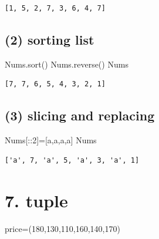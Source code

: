 \documentclass[
  a4paper,
  DIV=11,
  numbers=noendperiod]{scrreprt}
\newenvironment{Shaded}{\begin{snugshade}}{\end{snugshade}}
\newcommand{\DecValTok}[1]{\textcolor[rgb]{0.68,0.00,0.00}{#1}}
\newcommand{\NormalTok}[1]{\textcolor[rgb]{0.00,0.23,0.31}{#1}}
\newcommand{\OperatorTok}[1]{\textcolor[rgb]{0.37,0.37,0.37}{#1}}
\newcommand{\StringTok}[1]{\textcolor[rgb]{0.13,0.47,0.30}{#1}}
\begin{document}
\begin{verbatim}
[1, 5, 2, 7, 3, 6, 4, 7]
\end{verbatim}

\subsection*{(2) sorting list}\label{sorting-list}

\begin{Shaded}
\begin{Highlighting}[]
\NormalTok{Nums.sort()}
\NormalTok{Nums.reverse()}
\NormalTok{Nums}
\end{Highlighting}
\end{Shaded}

\begin{verbatim}
[7, 7, 6, 5, 4, 3, 2, 1]
\end{verbatim}

\subsection*{(3) slicing and replacing}\label{slicing-and-replacing}

\begin{Shaded}
\begin{Highlighting}[]
\NormalTok{Nums[::}\DecValTok{2}\NormalTok{]}\OperatorTok{=}\NormalTok{[}\StringTok{\textquotesingle{}a\textquotesingle{}}\NormalTok{,}\StringTok{\textquotesingle{}a\textquotesingle{}}\NormalTok{,}\StringTok{\textquotesingle{}a\textquotesingle{}}\NormalTok{,}\StringTok{\textquotesingle{}a\textquotesingle{}}\NormalTok{]}
\NormalTok{Nums}
\end{Highlighting}
\end{Shaded}

\begin{verbatim}
['a', 7, 'a', 5, 'a', 3, 'a', 1]
\end{verbatim}

\section*{7. tuple}\label{tuple}


\begin{Shaded}
\begin{Highlighting}[]
\NormalTok{price}\OperatorTok{=}\NormalTok{(}\DecValTok{180}\NormalTok{,}\DecValTok{130}\NormalTok{,}\DecValTok{110}\NormalTok{,}\DecValTok{160}\NormalTok{,}\DecValTok{140}\NormalTok{,}\DecValTok{170}\NormalTok{)}
\end{Highlighting}
\end{Shaded}
\end{document}
